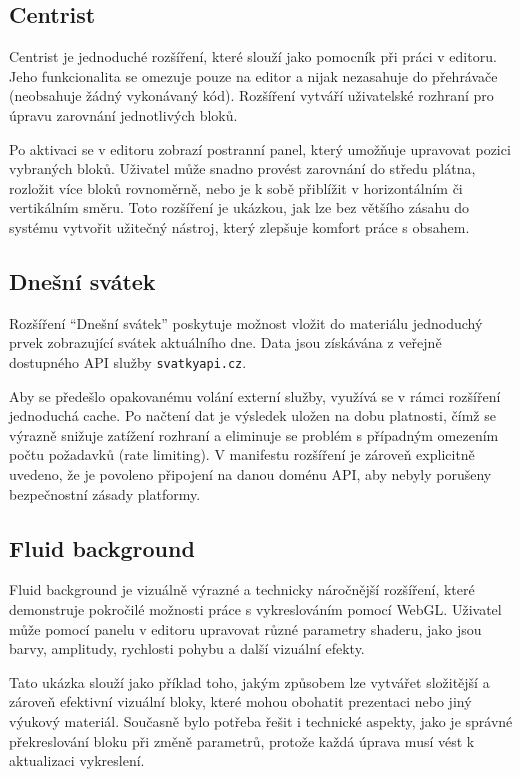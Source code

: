 \subsection{Centrist}

Centrist je jednoduché rozšíření, které slouží jako pomocník při práci v editoru.
Jeho funkcionalita se omezuje pouze na editor a nijak nezasahuje do přehrávače (neobsahuje žádný vykonávaný kód).
Rozšíření vytváří uživatelské rozhraní pro úpravu zarovnání jednotlivých bloků.

Po aktivaci se v editoru zobrazí postranní panel, který umožňuje upravovat pozici vybraných bloků. 
Uživatel může snadno provést zarovnání do středu plátna, rozložit více bloků rovnoměrně, nebo je k sobě přiblížit v horizontálním či vertikálním směru. 
Toto rozšíření je ukázkou, jak lze bez většího zásahu do systému vytvořit užitečný nástroj, který zlepšuje komfort práce s obsahem.

\subsection{Dnešní svátek}

Rozšíření \enquote{Dnešní svátek} poskytuje možnost vložit do materiálu jednoduchý prvek zobrazující svátek aktuálního dne. 
Data jsou získávána z veřejně dostupného API služby \texttt{svatkyapi.cz}.

Aby se předešlo opakovanému volání externí služby, využívá se v rámci rozšíření jednoduchá cache. 
Po načtení dat je výsledek uložen na dobu platnosti, čímž se výrazně snižuje zatížení rozhraní a eliminuje se problém s případným omezením počtu požadavků (rate limiting).
V manifestu rozšíření je zároveň explicitně uvedeno, že je povoleno připojení na danou doménu API, aby nebyly porušeny bezpečnostní zásady platformy.

\subsection{Fluid background}

Fluid background je vizuálně výrazné a technicky náročnější rozšíření, které demonstruje pokročilé možnosti práce s vykreslováním pomocí WebGL.
Uživatel může pomocí panelu v editoru upravovat různé parametry shaderu, jako jsou barvy, amplitudy, rychlosti pohybu a další vizuální efekty.

Tato ukázka slouží jako příklad toho, jakým způsobem lze vytvářet složitější a zároveň efektivní vizuální bloky, které mohou obohatit prezentaci nebo jiný výukový materiál. 
Současně bylo potřeba řešit i technické aspekty, jako je správné překreslování bloku při změně parametrů, protože každá úprava musí vést k aktualizaci vykreslení.

